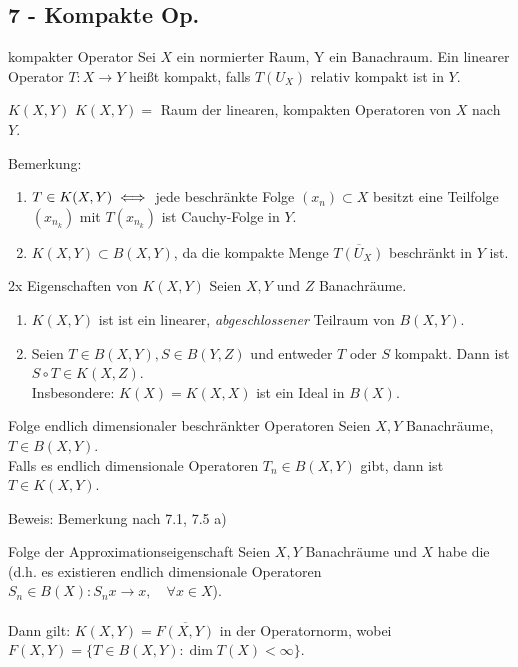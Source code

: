 \subsection*{7 - Kompakte Op.}

	\begin{karte}{kompakter Operator}
		Sei $X$ ein normierter Raum, Y ein Banachraum. Ein linearer Operator $T \colon X \rightarrow Y$ hei{\ss}t kompakt, falls $T(U_{X})$ relativ kompakt ist in $Y$.
	\end{karte}

	\begin{karte}{$K(X, Y)$}	
		$K(X, Y) =$ Raum der linearen, kompakten Operatoren von $X$ nach $Y$.
		
		Bemerkung:
		\begin{enumerate}[label=\alph*\upshape)]
			\item $T \in K(X, Y) \iff$ jede beschränkte Folge $(x_{n}) \subset X$ besitzt eine Teilfolge $(x_{n_{k}})$ mit $T(x_{n_{k}})$ ist Cauchy-Folge in $Y$.
			\item $K(X, Y) \subset B(X, Y)$, da die kompakte Menge $\overline{T(U_{X})}$ beschränkt in $Y$ ist.
		\end{enumerate}	
	\end{karte}

	\begin{karte}{2x Eigenschaften von $K(X, Y)$}		
		Seien $X, Y$ und $Z$ Banachräume.
		\begin{enumerate}[label=\alph*\upshape)]
			\item $K(X, Y)$ ist ist ein linearer, \textit{abgeschlossener} Teilraum von $B(X, Y)$.
			\item Seien $T \in B(X, Y), S \in B(Y, Z)$ und entweder $T$ oder $S$ kompakt. Dann ist $S \circ T \in K(X, Z)$. \\
			Insbesondere: $K(X) = K(X, X)$ ist ein Ideal in $B(X)$.
		\end{enumerate}
	\end{karte}

	\begin{karte}{Folge endlich dimensionaler beschränkter Operatoren}		
		Seien $X, Y$ Banachräume, $T \in B(X, Y)$. \\
		Falls es endlich dimensionale Operatoren $T_{n} \in B(X, Y)$ gibt, dann ist $T \in K(X, Y)$.
		
		Beweis:
			Bemerkung nach 7.1, 7.5 a)	
	\end{karte}

	\begin{karte}{Folge der Approximationseigenschaft}			
		Seien $X, Y$ Banachräume und $X$ habe die  (d.h. es existieren endlich dimensionale Operatoren $S_{n} \in B(X): S_{n} x \rightarrow x, \quad \forall x \in X$). \\ \\
		Dann gilt: $K(X, Y) = \overline{F(X, Y)}$ in der Operatornorm, wobei $F(X, Y) = \{ T \in B(X, Y): \dim T(X) < \infty \}$.
	\end{karte}